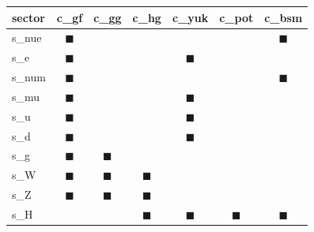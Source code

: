 \begin{tabular}{@{}lcccccc@{}}\toprule
sector & c\_gf & c\_gg & c\_hg & c\_yuk & c\_pot & c\_bsm \\\midrule
s\_nue & $\blacksquare$ &  &  &  &  & $\blacksquare$ \\
s\_e & $\blacksquare$ &  &  & $\blacksquare$ &  &  \\
s\_num & $\blacksquare$ &  &  &  &  & $\blacksquare$ \\
s\_mu & $\blacksquare$ &  &  & $\blacksquare$ &  &  \\
s\_u & $\blacksquare$ &  &  & $\blacksquare$ &  &  \\
s\_d & $\blacksquare$ &  &  & $\blacksquare$ &  &  \\
s\_g & $\blacksquare$ & $\blacksquare$ &  &  &  &  \\
s\_W & $\blacksquare$ & $\blacksquare$ & $\blacksquare$ &  &  &  \\
s\_Z & $\blacksquare$ & $\blacksquare$ & $\blacksquare$ &  &  &  \\
s\_H &  &  & $\blacksquare$ & $\blacksquare$ & $\blacksquare$ & $\blacksquare$ \\
\bottomrule\end{tabular}
